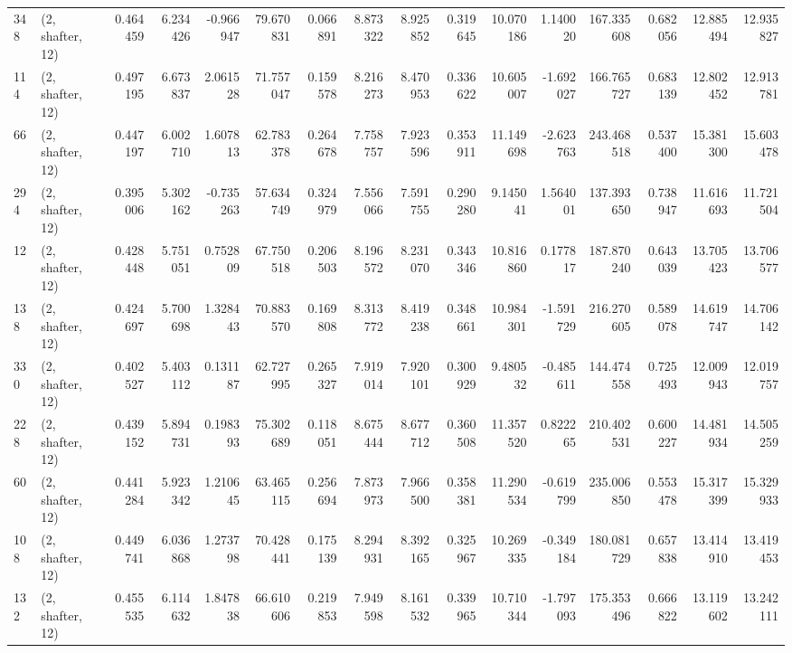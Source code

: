 \begin{tabular}{llrrrrrrrrrrrrrr}
348 &  (2, shafter, 12) &   0.464459 &   6.234426 &  -0.966947 &    79.670831 &   0.066891 &   8.873322 &   8.925852 &  0.319645 &  10.070186 &   1.140020 &   167.335608 &  0.682056 &  12.885494 &  12.935827 \\
114 &  (2, shafter, 12) &   0.497195 &   6.673837 &   2.061528 &    71.757047 &   0.159578 &   8.216273 &   8.470953 &  0.336622 &  10.605007 &  -1.692027 &   166.765727 &  0.683139 &  12.802452 &  12.913781 \\
66  &  (2, shafter, 12) &   0.447197 &   6.002710 &   1.607813 &    62.783378 &   0.264678 &   7.758757 &   7.923596 &  0.353911 &  11.149698 &  -2.623763 &   243.468518 &  0.537400 &  15.381300 &  15.603478 \\
294 &  (2, shafter, 12) &   0.395006 &   5.302162 &  -0.735263 &    57.634749 &   0.324979 &   7.556066 &   7.591755 &  0.290280 &   9.145041 &   1.564001 &   137.393650 &  0.738947 &  11.616693 &  11.721504 \\
12  &  (2, shafter, 12) &   0.428448 &   5.751051 &   0.752809 &    67.750518 &   0.206503 &   8.196572 &   8.231070 &  0.343346 &  10.816860 &   0.177817 &   187.870240 &  0.643039 &  13.705423 &  13.706577 \\
138 &  (2, shafter, 12) &   0.424697 &   5.700698 &   1.328443 &    70.883570 &   0.169808 &   8.313772 &   8.419238 &  0.348661 &  10.984301 &  -1.591729 &   216.270605 &  0.589078 &  14.619747 &  14.706142 \\
330 &  (2, shafter, 12) &   0.402527 &   5.403112 &   0.131187 &    62.727995 &   0.265327 &   7.919014 &   7.920101 &  0.300929 &   9.480532 &  -0.485611 &   144.474558 &  0.725493 &  12.009943 &  12.019757 \\
228 &  (2, shafter, 12) &   0.439152 &   5.894731 &   0.198393 &    75.302689 &   0.118051 &   8.675444 &   8.677712 &  0.360508 &  11.357520 &   0.822265 &   210.402531 &  0.600227 &  14.481934 &  14.505259 \\
60  &  (2, shafter, 12) &   0.441284 &   5.923342 &   1.210645 &    63.465115 &   0.256694 &   7.873973 &   7.966500 &  0.358381 &  11.290534 &  -0.619799 &   235.006850 &  0.553478 &  15.317399 &  15.329933 \\
108 &  (2, shafter, 12) &   0.449741 &   6.036868 &   1.273798 &    70.428441 &   0.175139 &   8.294931 &   8.392165 &  0.325967 &  10.269335 &  -0.349184 &   180.081729 &  0.657838 &  13.414910 &  13.419453 \\
132 &  (2, shafter, 12) &   0.455535 &   6.114632 &   1.847838 &    66.610606 &   0.219853 &   7.949598 &   8.161532 &  0.339965 &  10.710344 &  -1.797093 &   175.353496 &  0.666822 &  13.119602 &  13.242111 \\

\end{tabular}
